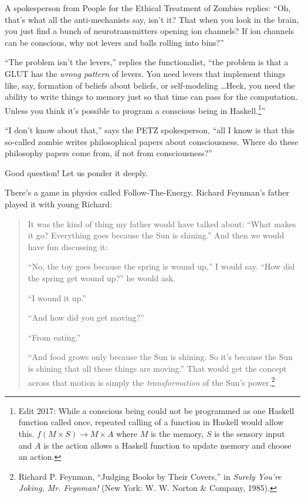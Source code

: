 {
 A spokesperson from People for the Ethical Treatment of Zombies
replies: ``Oh, that's what all the
anti-mechanists say, isn't it? That when you look in
the brain, you just find a bunch of neurotransmitters opening ion
channels? If ion channels can be conscious, why not levers and balls
rolling into bins?''}

{
 ``The problem isn't the
levers,'' replies the functionalist,
``the problem is that a GLUT has the \textit{wrong
pattern} of levers. You need levers that implement things like, say,
formation of beliefs about beliefs, or self-modeling \ldots Heck, you
need the ability to write things to memory just so that time can pass
for the computation. Unless you think it's possible to
program a conscious being in Haskell.\footnote{Edit 2017: While a conscious being could not be programmed as one Haskell function called once, repeated calling of a function in Haskell would allow this.  $f(M \times S) \to M \times A$ where $M$ is the memory, $S$ is the sensory input and $A$ is the action allows a Haskell function to update memory and choose an action.}''}

{
 ``I don't know about
that,'' says the PETZ spokesperson,
``all I know is that this so-called zombie writes
philosophical papers about consciousness. Where do these philosophy
papers come from, if not from consciousness?''}

{
 Good question! Let us ponder it deeply.}

{
 There's a game in physics called
Follow-The-Energy. Richard Feynman's father played it
with young Richard:}

\begin{quotation}
{
 It was the kind of thing my father would have talked about:
``What makes it go? Everything goes because the Sun is
shining.'' And then we would have fun discussing it:}

{
 ``No, the toy goes because the spring is wound
up,'' I would say. ``How did the
spring get wound up?'' he would ask.}

{
 ``I wound it up.''}

{
 ``And how did you get
moving?''}

{
 ``From eating.''}

{
 ``And food grows only because the Sun is shining.
So it's because the Sun is shining that all these
things are moving.'' That would get the concept
across that motion is simply the \textit{transformation} of the
Sun's power.\footnote{Richard P. Feynman, ``Judging Books by Their
Covers,'' in \textit{Surely You're
  Joking, Mr. Feynman!} (New York: W. W. Norton \& Company, 1985).}}
\end{quotation}

